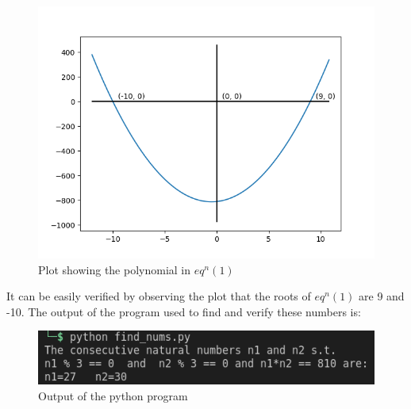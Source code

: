 \documentclass[11pt]{article}
\begin{document}
    \begin{figure}
        \includegraphics[width=\textwidth]{plot.png}
        \caption{Plot showing the polynomial in $eq^n(1)$}
    \end{figure}
    It can be easily verified by observing the plot that the roots of $eq^n (1)$ are 9 and -10.\newline
    \newline\newline
    The output of the program used to find and verify these numbers is:
    \begin{figure}
        \includegraphics[width=\textwidth]{output.png}
        \caption{Output of the python program}
    \end{figure}
\end{document}
